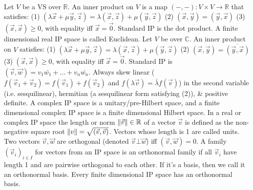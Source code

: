  Let $V$ be a VS over $\mathbb{R}$. An inner product on $V$ is a map $({-}, {-}) : V \times V \rightarrow \mathbb{R}$ that satisfies:
(1) $(\lambda \vec{x} + \mu \vec{y}, \vec{z}) = \lambda(\vec{x}, \vec{z}) + \mu(\vec{y}, \vec{z})$
(2) $(\vec{x}, \vec{y}) = (\vec{y}, \vec{x})$
(3) $(\vec{x}, \vec{x}) \ge 0$, with equality iff $\vec{x} = \vec{0}$.
Standard IP is the dot product.
A finite dimensional real IP space is called Euclidean.
 Let $V$ be over $\mathbb{C}$. An inner product on $V$ satisfies:
(1) $(\lambda \vec{x} + \mu \vec{y}, \vec{z}) = \lambda(\vec{x}, \vec{z}) + \mu(\vec{y}, \vec{z})$
(2) $(\vec{x}, \vec{y}) = \overline{(\vec{y}, \vec{x})}$
(3) $(\vec{x}, \vec{x}) \ge 0$, with equality iff $\vec{x} = \vec{0}$.
Standard IP is $(\vec{v}, \vec{w}) = v_1\bar{w_1} + \dots + v_n\bar{w_n}$.
Always skew linear ($f(\vec{v}_1 + \vec{v}_2) = f(\vec{v}_1) + f(\vec{v}_2)$ and $f(\lambda \vec{v}) = \bar{\lambda}f(\vec{v})$) in the second variable (i.e. sesquilinear),
hermitian (a sesquilinear form satisfying (2)), \& positive definite.
A complex IP space is a unitary/pre-Hilbert space, and a finite dimensional complex IP space is a finite dimensional Hilbert space.
 In a real or complex IP space the length or norm $\left\lVert \vec{v} \right\rVert \in \mathbb{R}$ of a vector $\vec{v}$ is defined as the non-negative square root $\left\lVert v \right\rVert = \sqrt{(\vec{v}, \vec{v})}$. Vectors whose length is 1 are called units. Two vectors $\vec{v}, \vec{w}$ are orthogonal (denoted $\vec{v} \bot \vec{w}$) iff $(\vec{v}, \vec{w}) = 0$.
 A family $(\vec{v}_i)_{i \in I}$ for vectors from an IP space is an orthonormal family if all $\vec{v}_i$ have length 1 and are pairwise orthogonal to each other. If it's a basis, then we call it an orthonormal basis.
 Every finite dimensional IP space has an orthonormal basis.